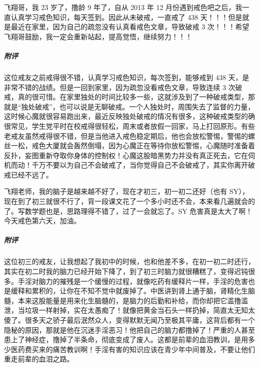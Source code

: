 \begin{case}
    飞翔哥，我 23 岁了，撸龄 9 年了，自从 2013 年 12 月份遇到戒色吧之后，我一直认真学习戒色知识，每天签到。因此从未破戒，一直戒了 438 天！！！但是就是最近在家里，因为自己的疏忽没有认真看戒色文章，导致破戒 3 次！！！希望飞翔哥鼓励，我一定会重新站起，提高觉悟，继续努力！！！
    \subparagraph{附评} 这位戒友之前戒得很不错，认真学习戒色知识，每次签到，能够戒到 438 天，是非常不错的战绩。但是一回到家里，因为疏忽没看戒色文章，导致连续 3 次破戒，真的很可惜。在家里独处的时间比较多一些，这就涉及到了一种破戒类型，那就是“独处破戒”，也可以说是无聊破戒。一个人独处时，周围失去了监督的力量，这时候心魔就很容易跑出来，最近反映独处破戒的情况有很多，这种破戒类型的确很常见，学生党平时在校戒得很轻松，周末或者放假一回家，马上打回原形。有些老戒友虽然戒得很不错，但是当他进入戒色稳定期后，他也会放松警惕，警惕的螺丝一松，戒色大厦就会轰然倒塌，因为心魔正在等待你放松警惕，心魔随时准备着反扑，妄图重新夺取你身体的控制权！心魔这股暗黑势力并没有真正死去，它在伺机而动！千万不要以为自己不会破戒了，当你觉得自己不会破戒了，其实你离开破戒已经不远了。
\end{case}

\begin{case}
    飞翔老师，我的脑子是越来越不好了，现在才初三，初一初二还好（也有 SY），现在到了初三就很不行了，背一段课文花了一个多小时还不会，本来看几遍就会的了。写数学题也是，思路理得不错了，过了一会就忘了。SY 危害真是太大了啊！今天戒色第六天，加油。
    \subparagraph{附评} 这位初三的戒友，让我想起了我初中的时候，也和他差不多，在初一初二时还行，其实在初二时我的脑力已经开始下降了，到了初三时脑力就很糟糕了，变得迟钝很多。手淫对脑力的摧残是一个缓慢的过程，就像吃药有缓释片一样，手淫的危害也是缓释和累积的，让你在不知不觉中就废掉了。中医讲到肾上通于脑，肾精化生脑髓，本来这股能量是用来化生脑髓的，是脑力的后勤和补给，而你却把它滥撸滥泄，当垃圾一样射掉，实在太愚痴了！就像把黄金当石头一样扔掉，简直太无知太傻了。很多天之骄子最后泯然众人，变得默默无闻乃至极其平庸，这背后都有一个隐秘的原因，那就是他在沉迷手淫恶习！他把自己的脑力都撸掉了！严重的人甚至患上了神经症，撸掉了半条命，彻底变成了废人。这都是前辈的血泪教训，是用多少医药费买来的痛苦教训啊！手淫有害的知识应该在青少年中间普及，不要让他们重走前辈的血泪之路。
\end{case}

